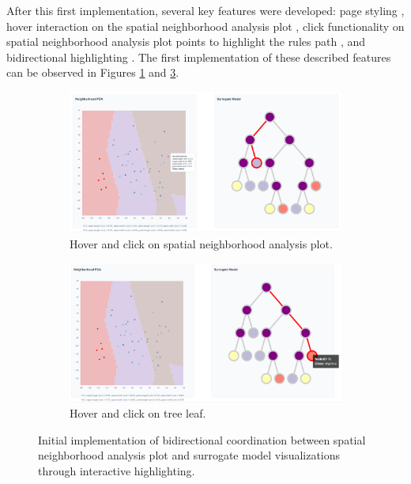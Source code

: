 After this first implementation, several key features were developed: page styling \cite{git8commit}, hover interaction on the spatial neighborhood analysis plot \cite{git9commit}, click functionality on spatial neighborhood analysis plot points to highlight the rules path \cite{git10commit}, and bidirectional highlighting \cite{git11commit}. The first implementation of these described features can be observed in Figures \ref{fig:hover and highlight first scatter} and \ref{fig:hover and highlight first tree}.

\begin{figure}
    \centering
    \begin{subfigure}[c]{\textwidth}
        \centering
        \includegraphics[width=\textwidth]{images/highlight points to leaf first.png}
        \caption{Hover and click on spatial neighborhood analysis plot.}
        \label{fig:hover and highlight first scatter}
    \end{subfigure}

    \begin{subfigure}[c]{\textwidth}
        \centering
        \includegraphics[width=\textwidth]{images/highlight leaf to points first.png}
        \caption{Hover and click on tree leaf.}
        \label{fig:hover and highlight first tree}
    \end{subfigure}

    \caption{Initial implementation of bidirectional coordination between spatial neighborhood analysis plot and surrogate model visualizations through interactive highlighting.}
    
\end{figure}


